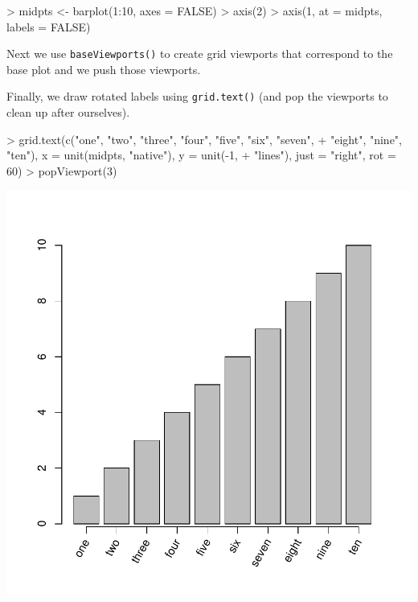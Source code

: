 \documentclass[a4paper]{article}
\begin{document}
\begin{Schunk}
\begin{Sinput}
> midpts <- barplot(1:10, axes = FALSE)
> axis(2)
> axis(1, at = midpts, labels = FALSE)
\end{Sinput}
\end{Schunk}
Next we  use \verb|baseViewports()| to 
create grid viewports that correspond to the base plot and we push
those viewports.

\begin{Schunk}
\end{Schunk}
Finally, we draw rotated labels using 
\verb|grid.text()| (and pop the viewports to clean up after ourselves).

\begin{Schunk}
\begin{Sinput}
> grid.text(c("one", "two", "three", "four", "five", "six", "seven", 
+     "eight", "nine", "ten"), x = unit(midpts, "native"), y = unit(-1, 
+     "lines"), just = "right", rot = 60)
> popViewport(3)
\end{Sinput}
\end{Schunk}
\includegraphics{gridBase-005}
\end{document}
